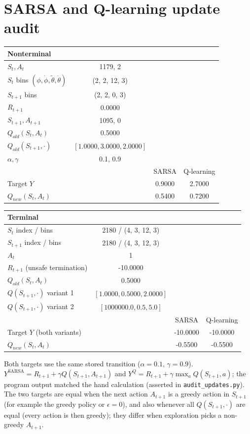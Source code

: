 \documentclass[11pt]{article}
\newcommand{\auditgamma}{0.9}
\newcommand{\auditalpha}{0.1}
\begin{document}
\section{SARSA and Q-learning update audit}
\begin{center}\small\begin{tabular}{lccc}
\toprule
Nonterminal &  &  &  \\
\midrule
$S_t, A_t$ & 1179, 2 &  &  \\
$S_t$ bins $(\phi,\dot\phi,\widetilde\theta,\dot\theta)$ & (2, 2, 12, 3) &  &  \\
$S_{t+1}$ bins & (2, 2, 0, 3) &  &  \\
$R_{t+1}$ & 0.0000 &  &  \\
$S_{t+1}, A_{t+1}$ & 1095, 0 &  &  \\
$Q_{old}(S_t,A_t)$ & 0.5000 &  &  \\
$Q_{old}(S_{t+1},\cdot)$ & $[1.0000, 3.0000, 2.0000]$ &  &  \\
$\alpha,\gamma$ & 0.1, 0.9 &  &  \\
 &  & SARSA & Q-learning \\
Target $Y$ &  & 0.9000 & 2.7000 \\
$Q_{new}(S_t,A_t)$ &  & 0.5400 & 0.7200 \\
\bottomrule
\end{tabular}
\medskip
\begin{tabular}{lccc}
\toprule
Terminal &  &  &  \\
\midrule
$S_t$ index / bins & 2180 / (4, 3, 12, 3) &  &  \\
$S_{t+1}$ index / bins & 2180 / (4, 3, 12, 3) &  &  \\
$A_t$ & 1 &  &  \\
$R_{t+1}$ (unsafe termination) & -10.0000 &  &  \\
$Q_{old}(S_t,A_t)$ & 0.5000 &  &  \\
$Q(S_{t+1},\cdot)$ variant 1 & $[1.0000, 0.5000, 2.0000]$ &  &  \\
$Q(S_{t+1},\cdot)$ variant 2 & $[1000000.0, 0.5, 5.0]$ &  &  \\
 &  & SARSA & Q-learning \\
Target $Y$ (both variants) &  & -10.0000 & -10.0000 \\
$Q_{new}(S_t,A_t)$ &  & -0.5500 & -0.5500 \\
\bottomrule
\end{tabular}\end{center}
Both targets use the same stored transition ($\alpha=\auditalpha$, $\gamma=\auditgamma$). $Y^{\text{SARSA}}=R_{t+1}+\gamma Q(S_{t+1},A_{t+1})$ and $Y^{Q}=R_{t+1}+\gamma\max_a Q(S_{t+1},a)$; the program output matched the hand calculation (asserted in \texttt{audit\_updates.py}). The two targets are equal when the next action $A_{t+1}$ is a greedy action in $S_{t+1}$ (for example the greedy policy or $\epsilon=0$), and also whenever all $Q(S_{t+1},\cdot)$ are equal (every action is then greedy); they differ when exploration picks a non-greedy $A_{t+1}$.
\end{document}
